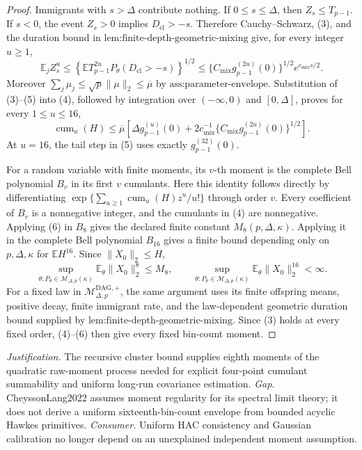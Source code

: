 \documentclass{article}
\begin{document}
\begin{proof}
Immigrants with \(s>\Delta\) contribute nothing.  If \(0\leq s\leq\Delta\), then \(Z_s\leq T_{p-1}\).  If \(s<0\), the event \(Z_s>0\) implies \(D_{\mathrm{cl}}>-s\).  Therefore Cauchy--Schwarz, (3), and the duration bound in \(\text{lem:finite-depth-geometric-mixing}\) give, for every integer \(u\geq1\),
\[
 \mathbb E_j Z_s^u
 \leq
 \left\{\mathbb E T_{p-1}^{2u}
 P_{\theta}(D_{\mathrm{cl}}>-s)\right\}^{1/2}
 \leq
 \{C_{\mathrm{mix}}g_{p-1}^{(2u)}(0)\}^{1/2}
 e^{c_{\mathrm{mix}}s/2}.
\tag{5}
\]
Moreover \(\sum_j\mu_j\leq\sqrt p\lVert\mu\rVert_2\leq\overline\mu\) by \(\text{ass:parameter-envelope}\).  Substitution of (3)--(5) into (4), followed by integration over \(( -\infty,0)\) and \([0,\Delta]\), proves for every \(1\leq u\leq16\),
\[
 \operatorname{cum}_u(H)
 \leq\overline\mu\left[
 \Delta g_{p-1}^{(u)}(0)
 +2c_{\mathrm{mix}}^{-1}
 \{C_{\mathrm{mix}}g_{p-1}^{(2u)}(0)\}^{1/2}
 \right].
\tag{6}
\]
At \(u=16\), the tail step in (5) uses exactly \(g_{p-1}^{(32)}(0)\).

For a random variable with finite moments, its \(v\)-th moment is the complete Bell polynomial \(B_v\) in its first \(v\) cumulants.  Here this identity follows directly by differentiating \(\exp\{\sum_{u\geq1}\operatorname{cum}_u(H)z^u/u!\}\) through order \(v\).  Every coefficient of \(B_v\) is a nonnegative integer, and the cumulants in (4) are nonnegative.  Applying (6) in \(B_8\) gives the declared finite constant \(M_8(p,\Delta,\kappa)\).  Applying it in the complete Bell polynomial \(B_{16}\) gives a finite bound depending only on \(p,\Delta,\kappa\) for \(\mathbb E H^{16}\).  Since \(\lVert X_0\rVert_2\leq H\),
\[
 \sup_{\theta:P_\theta\in\mathcal M_{\Delta,p}(\kappa)}
 \mathbb E_\theta\lVert X_0\rVert_2^8\leq M_8,
 \qquad
 \sup_{\theta:P_\theta\in\mathcal M_{\Delta,p}(\kappa)}
 \mathbb E_\theta\lVert X_0\rVert_2^{16}<\infty.
\tag{7}
\]
For a fixed law in \(\mathcal M_{\Delta,p}^{\mathrm{DAG},+}\), the same argument uses its finite offspring means, positive decay, finite immigrant rate, and the law-dependent geometric duration bound supplied by \(\text{lem:finite-depth-geometric-mixing}\).  Since (3) holds at every fixed order, (4)--(6) then give every fixed bin-count moment.
\end{proof}
\par\smallskip\noindent \textit{Justification.} The recursive cluster bound supplies eighth moments of the quadratic raw-moment process needed for explicit four-point cumulant summability and uniform long-run covariance estimation. \textit{Gap.} CheyssonLang2022 assumes moment regularity for its spectral limit theory; it does not derive a uniform sixteenth-bin-count envelope from bounded acyclic Hawkes primitives. \textit{Consumer.} Uniform HAC consistency and Gaussian calibration no longer depend on an unexplained independent moment assumption.
\end{document}
